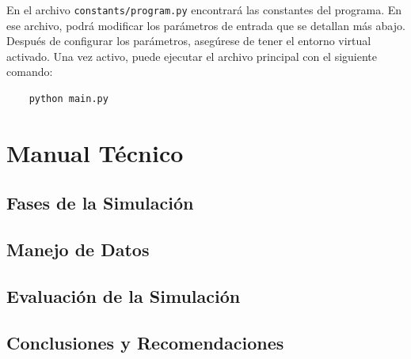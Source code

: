 \documentclass{article}
\begin{document}
En el archivo \texttt{constants/program.py} encontrará las constantes del programa. 
En ese archivo, podrá modificar los parámetros de entrada que se detallan más abajo.\\

Después de configurar los parámetros, asegúrese de tener el entorno virtual activado. 
Una vez activo, puede ejecutar el archivo principal con el siguiente comando:

\begin{center}
  \begin{adjustbox}{minipage=\linewidth, center}
  \begin{verbatim}
    python main.py
  \end{verbatim}
  \end{adjustbox}
\end{center}


\section{Manual Técnico}\label{sec:man_t}


\subsection{Fases de la Simulación}


\subsection{Manejo de Datos}

\subsection{Evaluación de la Simulación}


\subsection{Conclusiones y Recomendaciones}


\end{document}
